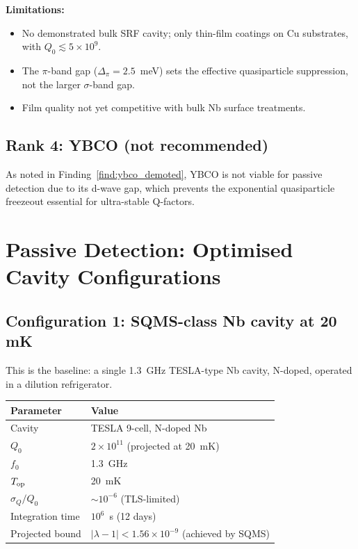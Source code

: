 \documentclass[11pt]{article}
\theoremstyle{definition}
\theoremstyle{remark}
\newcommand{\ee}[1]{\times 10^{#1}}
\newcommand{\lambdabound}{1.56\ee{-9}}
\newcommand{\lam}{|\lambda-1|}
\begin{document}
\textbf{Limitations:}
\begin{itemize}[nosep]
  \item No demonstrated bulk SRF cavity; only thin-film coatings on
    Cu substrates, with $Q_0 \lesssim 5\ee{9}$.
  \item The $\pi$-band gap ($\Delta_\pi = 2.5$~meV) sets the
    effective quasiparticle suppression, not the larger $\sigma$-band
    gap.
  \item Film quality not yet competitive with bulk Nb surface treatments.
\end{itemize}

\subsection{Rank 4: YBCO (not recommended)}

As noted in Finding~\ref{find:ybco_demoted}, YBCO is not viable for
passive detection due to its d-wave gap, which prevents the exponential
quasiparticle freezeout essential for ultra-stable Q-factors.


\section{Passive Detection: Optimised Cavity Configurations}
\label{sec:passive_configs}

\subsection{Configuration 1: SQMS-class Nb cavity at 20 mK}

This is the baseline: a single 1.3~GHz TESLA-type Nb cavity, N-doped,
operated in a dilution refrigerator.

\begin{center}
\begin{tabular}{ll}
\toprule
Parameter & Value \\
\midrule
Cavity & TESLA 9-cell, N-doped Nb \\
$Q_0$ & $2\ee{11}$ (projected at 20~mK) \\
$f_0$ & 1.3~GHz \\
$T_{\rm op}$ & 20~mK \\
$\sigma_Q/Q_0$ & $\sim 10^{-6}$ (TLS-limited) \\
Integration time & $10^6$~s (12 days) \\
Projected bound & $\lam < \lambdabound$ (achieved by SQMS) \\
\bottomrule
\end{tabular}
\end{center}
\end{document}
